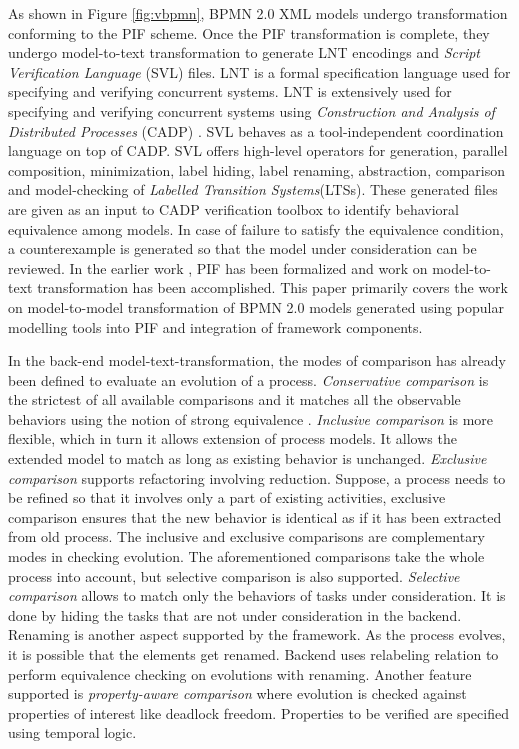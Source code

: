 \documentclass{article}
\begin{document}
As shown in Figure \ref{fig:vbpmn}, BPMN 2.0 XML models undergo transformation conforming to the PIF scheme. Once the PIF transformation is complete, they undergo model-to-text transformation to generate LNT encodings and \textit{Script Verification Language} (SVL) \cite{SVL:Ref} files. LNT is a formal specification language used for specifying and verifying concurrent systems. LNT is extensively used for specifying and verifying concurrent systems using \textit {Construction and Analysis of Distributed Processes} (CADP) \cite{CADP:Ref}. SVL behaves as a tool-independent coordination language on top of CADP. SVL offers high-level operators for generation, parallel composition, minimization, label hiding, label renaming, abstraction, comparison and model-checking of \textit{Labelled Transition Systems}(LTSs). These generated files are given as an input to CADP verification toolbox to identify behavioral equivalence among models. In case of failure to satisfy the equivalence condition, a counterexample is generated so that the model under consideration can be reviewed. In the earlier work \cite{VBPMN:Ref}, PIF has been formalized and work on model-to-text transformation has been accomplished. This paper primarily covers the work on model-to-model transformation of BPMN 2.0 models generated using popular modelling tools into PIF and integration of framework components. 

In the back-end model-text-transformation, the modes of comparison has already been defined \cite{VBPMN:Ref} to evaluate an evolution of a process. \textit{Conservative comparison} is the strictest of all available comparisons and it matches all the observable behaviors using the notion of strong equivalence \cite{Milner:Book}. \textit{Inclusive comparison} is more flexible, which in turn it allows extension of process models. It allows the extended model to match as long as existing behavior is unchanged. \textit{Exclusive comparison} supports refactoring involving reduction. Suppose, a process needs to be refined so that it involves only a part of existing activities, exclusive comparison ensures that the new behavior is identical as if it has been extracted from old process. The inclusive and exclusive comparisons are complementary modes in checking evolution. The aforementioned comparisons take the whole process into account, but selective comparison is also supported. \textit{Selective comparison} allows to match only the behaviors of tasks under consideration. It is done by hiding the tasks that are not under consideration in the backend. Renaming is another aspect supported by the framework. As the process evolves, it is possible that the elements get renamed. Backend uses relabeling relation \cite{VBPMN:Ref} to perform equivalence checking on evolutions with renaming. Another feature supported is \textit{property-aware comparison} where evolution is checked against properties of interest like deadlock freedom. Properties to be verified are specified using temporal logic. 
\end{document}
